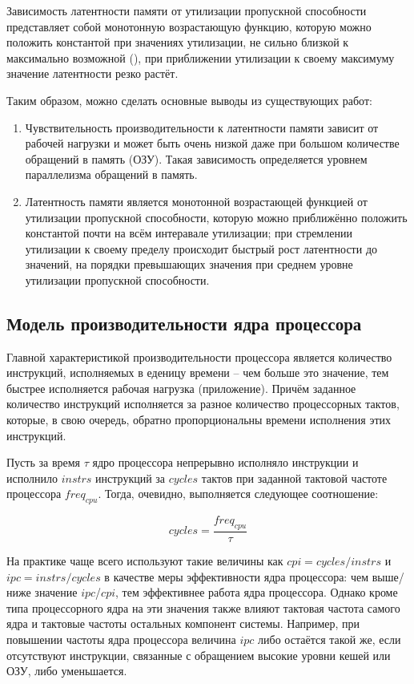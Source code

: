     Зависимость латентности памяти от утилизации пропускной способности представляет собой монотонную
    возрастающую функцию, которую можно положить константой при значениях утилизации, не сильно близкой
    к максимально возможной (\cite{david2011memory}), при приближении утилизации к своему максимуму
    значение латентности резко растёт.

    Таким образом, можно сделать основные выводы из существующих работ:
    \begin{enumerate}
        \item Чувствительность производительности к латентности памяти зависит от рабочей нагрузки и может
        быть очень низкой даже при большом количестве обращений в память (ОЗУ). Такая зависимость
        определяется уровнем параллелизма обращений в память.
        \item Латентность памяти является монотонной возрастающей функцией от утилизации пропускной
        способности, которую можно приближённо положить константой почти на всём интеравале утилизации;
        при стремлении утилизации к своему пределу происходит быстрый рост латентности до значений,
        на порядки превышающих значения при среднем уровне утилизации пропускной способности.
    \end{enumerate}

\subsection{Модель производительности ядра процессора}

    Главной характеристикой производительности процессора является количество инструкций,
    исполняемых в еденицу времени -- чем больше это значение, тем быстрее исполняется рабочая
    нагрузка (приложение). Причём заданное количество инструкций исполняется за разное количество
    процессорных тактов, которые, в свою очередь, обратно пропорциональны времени исполнения
    этих инструкций.

    Пусть за время $\tau$ ядро процессора непрерывно исполняло инструкции и исполнило $instrs$
    инструкций за $cycles$ тактов при заданной тактовой частоте процессора $freq_{cpu}$.
    Тогда, очевидно, выполняется следующее соотношение:

    \begin{equation} \label{cycles_base}
        cycles = \frac{freq_{cpu}}{\tau}
    \end{equation}

    На практике чаще всего используют такие величины как $cpi = cycles / instrs$ и
    $ipc = instrs / cycles$ в качестве меры эффективности ядра процессора: чем выше/ниже значение
    $ipc$/$cpi$, тем эффективнее работа ядра процессора. Однако кроме типа процессорного ядра
    на эти значения также влияют тактовая частота самого ядра и тактовые частоты остальных компонент
    системы. Например, при повышении частоты ядра процессора величина $ipc$ либо остаётся такой же,
    если отсутствуют инструкции, связанные с обращением высокие уровни кешей или ОЗУ, либо уменьшается.

